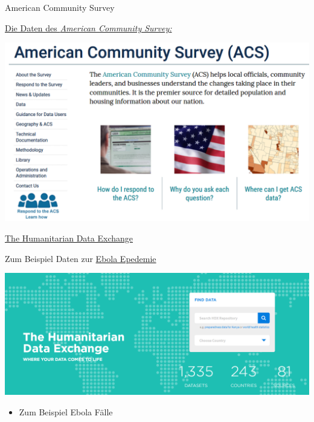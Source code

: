 \documentclass[ignorenonframetext,]{beamer}
\providecommand{\tightlist}{%
  \setlength{\itemsep}{0pt}\setlength{\parskip}{0pt}}
\begin{document}
\begin{frame}{American Community Survey}
\protect\hypertarget{american-community-survey}{}

\begin{block}{\href{http://www.census.gov/acs/www/}{Die Daten des
\emph{American Community Survey:}}}

\includegraphics{figure/ACS.PNG}

\end{block}

\end{frame}

\begin{frame}{\href{data.hdx.rwlabs.org}{The Humanitarian Data
Exchange}}
\protect\hypertarget{the-humanitarian-data-exchange}{}

\begin{block}{Zum Beispiel Daten zur
\href{https://data.hdx.rwlabs.org/dataset/rowca-ebola-cases}{Ebola
Epedemie}}

\includegraphics{figure/HDx.PNG}

\begin{itemize}
\tightlist
\item
  Zum Beispiel Ebola Fälle
\end{itemize}

\end{block}

\end{frame}
\end{document}
